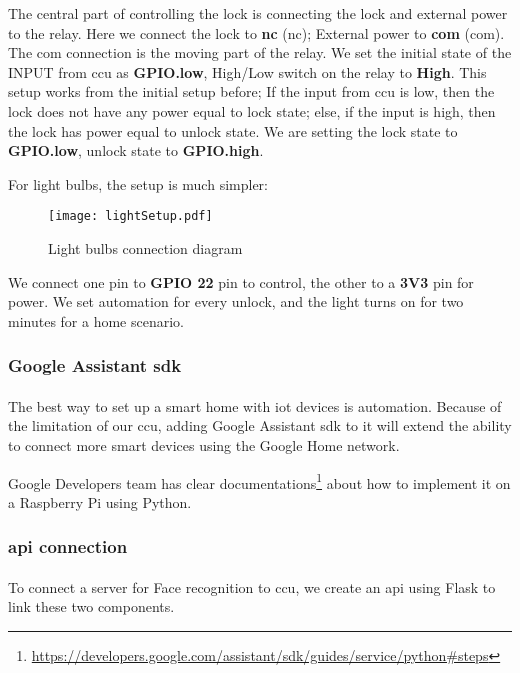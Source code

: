 The central part of controlling the lock is connecting the lock and external power to the relay. Here we connect the lock to \textbf{\acrshort{nc}} (\acrlong{nc}); External power to \textbf{\acrshort{com}} (\acrlong{com}). The \acrshort{com} connection is the moving part of the relay. We set the initial state of the INPUT from \acrshort{ccu} as \textbf{GPIO.low}, High/Low switch on the relay to \textbf{High}. This setup works from the initial setup before; If the input from \acrshort{ccu} is low, then the lock does not have any power equal to lock state; else, if the input is high, then the lock has power equal to unlock state. We are setting the lock state to \textbf{GPIO.low}, unlock state to \textbf{GPIO.high}.

For light bulbs, the setup is much simpler:

\begin{figure}[H]
    \centering
    \texttt{[image: lightSetup.pdf]}
    \caption{Light bulbs connection diagram}
\end{figure}

We connect one pin to \textbf{GPIO 22} pin to control, the other to a \textbf{3V3} pin for power. We set automation for every unlock, and the light turns on for two minutes for a home scenario.

\subsubsection{Google Assistant \acrshort{sdk}}
\paragraph{}
The best way to set up a smart home with \acrshort{iot} devices is automation. Because of the limitation of our \acrshort{ccu}, adding Google Assistant \acrshort{sdk} to it will extend the ability to connect more smart devices using the Google Home network.

Google Developers team has clear documentations\footnote{\url{https://developers.google.com/assistant/sdk/guides/service/python#steps}} about how to implement it on a Raspberry Pi using Python.


\subsubsection{\acrshort{api} connection}
\paragraph{}
To connect a server for Face recognition to \acrlong{ccu}, we create an \acrfull{api} using Flask to link these two components.


